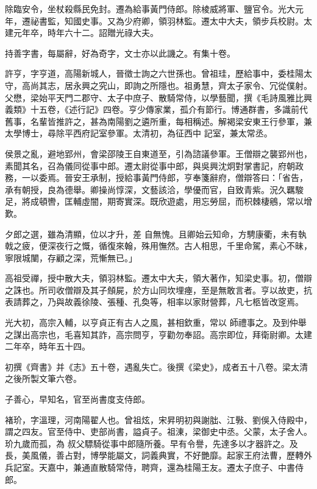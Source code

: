 \begin{pinyinscope}
 除臨安令，坐杖殺縣民免封。遷為給事黃門侍郎。除棱威將軍、鹽官令。光大元年，遷祕書監，知國史事。又為少府卿，領羽林監。遷太中大夫，領步兵校尉。太建元年卒，時年六十二。詔贈光祿大夫。



 持善字書，每屬辭，好為奇字，文士亦以此譏之。有集十卷。



 許亨，字亨道，高陽新城人，晉徵士詢之六世孫也。曾祖珪，歷給事中，委桂陽太守，高尚其志，居永興之究山，即詢之所隱也。祖勇慧，齊太子家令、冗從僕射。父懋，梁始平天門二郡守、太子中庶子、散騎常侍，以學藝聞，撰《毛詩風雅比興義類》十五卷，《述行記》四卷。亨少傳家業，孤介有節行。博通群書，多識前代舊事，名輩皆推許之，甚為南陽劉之遴所重，每相稱述。解褐梁安東王行參軍，兼太學博士，尋除平西府記室參軍。太清初，為征西中
 記室，兼太常丞。



 侯景之亂，避地郢州，會梁邵陵王自東道至，引為諮議參軍。王僧辯之襲郢州也，素聞其名，召為儀同從事中郎。遷太尉從事中郎，與吳興沈炯對掌書記，府朝政務，一以委焉。晉安王承制，授給事黃門侍郎，亨奉箋辭府，僧辯答曰：「省告，承有朝授，良為德舉。卿操尚惇深，文藝該洽，學優而官，自致青紫。況久羈駿足，將成頓轡，匡輔虛闇，期寄實深。既欣遊處，用忘勞屈，而枳棘棲鵷，常以增歎。



 夕郎之選，雖為清顯，位以才升，差
 自無愧。且卿始云知命，方騁康衢，未有執戟之疲，便深夜行之慨，循復來翰，殊用憮然。古人相思，千里命駕，素心不昧，寧限城闉，存顧之深，荒慚無已。」



 高祖受禪，授中散大夫，領羽林監。遷太中大夫，領大著作，知梁史事。初，僧辯之誅也。所司收僧辯及其子頠屍，於方山同坎埋瘞，至是無敢言者。亨以故吏，抗表請葬之，乃與故義徐陵、張種、孔奐等，相率以家財營葬，凡七柩皆改窆焉。



 光大初，高宗入輔，以亨貞正有古人之風，甚相欽重，常以
 師禮事之。及到仲舉之謀出高宗也，毛喜知其詐，高宗問亨，亨勸勿奉詔。高宗即位，拜衛尉卿。太建二年卒，時年五十四。



 初撰《齊書》并《志》五十卷，遇亂失亡。後撰《梁史》，成者五十八卷。梁太清之後所製文筆六卷。



 子善心，早知名，官至尚書度支侍郎。



 褚玠，字溫理，河南陽翟人也。曾祖炫，宋昇明初與謝朏、江斅、劉俁入侍殿中，謂之四友。官至侍中、吏部尚書，謚貞子。祖涷，梁御史中丞。父蒙，太子舍人。玠九歲而孤，為
 叔父驃騎從事中郎隨所養。早有令譽，先達多以才器許之。及長，美風儀，善占對，博學能屬文，詞義典實，不好艷靡。起家王府法曹，歷轉外兵記室。天嘉中，兼通直散騎常侍，聘齊，還為桂陽王友。遷太子庶子、中書侍郎。




\end{pinyinscope}
